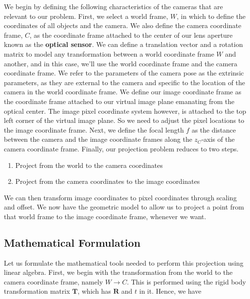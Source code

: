 We begin by defining the following
characteristics of the cameras that are
relevant to our problem. First, we select
a world frame, $W$, in which to define the coordinates of
all objects and the camera. We also define the camera coordinate frame, $C$, as
the coordinate frame attached to the center of our lens aperture known
as the \textbf{optical sensor}. We can define a translation
vector and a rotation matrix to model any transformation between a world coordinate
frame $W$ and another, and in this case, we'll use the world coordinate frame and
the camera coordinate frame. We refer to the parameters of the camera pose as the extrinsic parameters, as they are external to
the camera and specific to the location of the camera in the world coordinate frame. We define our image coordinate frame as the coordinate
frame attached to our virtual image plane emanating from
the optical center. The image pixel coordinate system however, is attached to
the top left corner of the virtual image plane. So we need to adjust the pixel locations to
the image coordinate frame. Next, we define the focal length $f$
as the distance between the camera and the image coordinate frames along the $z_C$-axis of
the camera coordinate frame. Finally, our projection problem reduces to two steps. 

\begin{enumerate}
\item Project from the world to the camera coordinates
\item Project from the camera coordinates to the image coordinates 
\end{enumerate}

We can then transform image coordinates to pixel coordinates through
scaling and offset. We now have the geometric model to allow us to
project a point from that world frame to the image coordinate frame,
whenever we want. 


\subsection{Mathematical Formulation}
\label{mathematical_formulation}

Let us formulate the mathematical tools needed to perform this
projection using linear algebra. First, we begin with the transformation from the world to the camera
coordinate frame, namely $W \rightarrow C$. This is performed using the rigid body
transformation matrix $\mathbf{T}$, which has $\mathbf{R}$ and $t$ in it. Hence, we have


